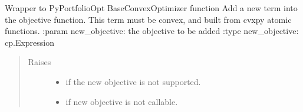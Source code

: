 \documentclass[letterpaper,10pt,english]{sphinxmanual}
\begin{document}
\begin{fulllineitems}
\begin{fulllineitems}
\label{\detokenize{dalio.model:dalio.model.financial.MakeEfficientFrontier.add_objective}}
Wrapper to PyPortfolioOpt BaseConvexOptimizer function
Add a new term into the objective function. This term must be convex,
and built from cvxpy atomic functions.
:param new\_objective: the objective to be added
:type new\_objective: cp.Expression
\begin{quote}\begin{description}
\item[{Raises}] \leavevmode\begin{itemize}
\item {} 
 \textendash{} if the new objective is not supported.

\item {} 
 \textendash{} if new objective is not callable.

\end{itemize}

\end{description}\end{quote}

\end{fulllineitems}


\begin{fulllineitems}
\label{\detokenize{dalio.model:dalio.model.financial.MakeEfficientFrontier.add_sector_definitions}}
\end{fulllineitems}


\begin{fulllineitems}
\label{\detokenize{dalio.model:dalio.model.financial.MakeEfficientFrontier.add_sector_weight_constraint}}
\end{fulllineitems}


\end{fulllineitems}
\end{document}
